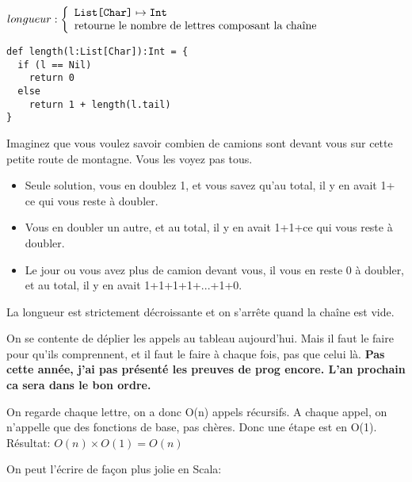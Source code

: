 \documentclass[10pt]{article}\usepackage[nu]{esial}
\begin{document}
\newcommand{\Type}[1]{\text{\texttt{#1}}}
\begin{Question}
  $longueur: \left\{
    \begin{array}{l}
      \Type{List[Char]}\mapsto \Type{Int}\\
      \text{retourne le nombre de lettres composant la chaîne}
    \end{array}\right.$
\end{Question}
\begin{Reponse}
  \begin{Verbatim}[label=longueur(ch)]
def length(l:List[Char]):Int = {
  if (l == Nil)
    return 0
  else 
    return 1 + length(l.tail)
}
  \end{Verbatim}
  \begin{description}
    \item
    \item[Idée pour trouver comment faire] Imaginez que vous voulez savoir
      combien de camions sont devant vous sur cette petite route de
      montagne. Vous les voyez pas tous.
      \begin{itemize}
      \item Seule solution, vous en doublez 1, et vous savez qu'au total, il y
        en avait 1+ ce qui vous reste à doubler.
      \item  Vous en doubler un autre, et au total, il y en avait 1+1+ce qui
        vous reste à doubler.
      \item Le jour ou vous avez plus de camion devant vous, il vous en reste 0
        à doubler, et au total, il y en avait 1+1+1+1+...+1+0.
      \end{itemize}
  \item[Terminaison:] La longueur est strictement décroissante et on s'arrête
    quand la chaîne est vide.
  \item[Correction:] On se contente de déplier les appels au tableau
    aujourd'hui. Mais il faut le faire pour qu'ils comprennent, et il faut le
    faire à chaque fois, pas que celui là. \textbf{Pas cette année, j'ai pas
      présenté les preuves de prog encore. L'an prochain ca sera dans le bon
      ordre.} 
  \item[Complexité:] On regarde chaque lettre, on a donc O(n) appels
    récursifs. A chaque appel, on n'appelle que des fonctions de base, pas
    chères. Donc une étape est en O(1). Résultat: $O(n)\times O(1)=O(n)$
  \end{description}
On peut l'écrire de façon plus jolie en Scala:


\end{Reponse}
\end{document}
